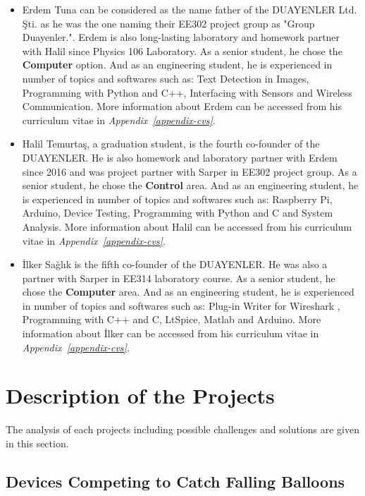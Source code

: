 \documentclass[a4paper,12pt]{article}
\begin{document}
\begin{itemize}
\begin{figure}[H]
\end{figure}	
	
	\item Erdem Tuna can be considered as the name father of the DUAYENLER Ltd. Şti. as he was the one naming their EE302 project group as "Group Duayenler.". Erdem is also long-lasting laboratory and homework partner with Halil since Physics 106 Laboratory. As a senior student, he chose the \textbf{Computer} option. And as an engineering student, he is experienced in number of topics and softwares such as: Text Detection in Images, Programming with Python and C++, Interfacing with Sensors and Wireless Communication. More information about Erdem can be accessed from his curriculum vitae in  \textit{Appendix~\ref{appendix-cvs}}.\\[1cm]
	
	\item Halil Temurtaş, a graduation student, is the fourth co-founder of the DUAYENLER. He is also homework and laboratory partner with Erdem since 2016 and was project partner with Sarper in EE302 project group. As a senior student, he chose the \textbf{Control} area. And as an engineering student, he is experienced in number of topics and softwares such as: Raspberry Pi, Arduino, Device Testing, Programming with Python and C and System Analysis. More information about Halil can be accessed from his curriculum vitae in  \textit{Appendix~\ref{appendix-cvs}}.
	\item İlker Sağlık is the fifth co-founder of the DUAYENLER. He was also a partner with Sarper in EE314 laboratory course. As a senior student, he chose the \textbf{Computer} area. And as an engineering student, he is experienced in number of topics and softwares such as: Plug-in Writer for Wireshark , Programming with C++ and C, LtSpice, Matlab and Arduino. More information about İlker can be accessed from his curriculum vitae in  \textit{Appendix~\ref{appendix-cvs}}.
\end{itemize}


\section{Description of the Projects}
The analysis of each projects including possible challenges and solutions are given in this section.

\subsection{Devices Competing to Catch Falling Balloons}
\end{document}
